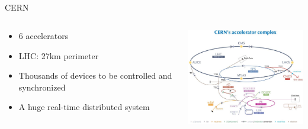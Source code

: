 \documentclass[compress,red]{beamer}
\begin{document}
\subsection{}
\begin{frame}{CERN}

\begin{columns}[c]
    \begin{center}

      \begin{itemize}
	\item 6 accelerators
	\item LHC: 27km perimeter
	\item Thousands of devices to be controlled and synchronized
	\item A huge real-time distributed system
      \end{itemize}

    \end{center}
    \begin{center}
      \includegraphics[width=6.5cm]{applications/CERN/accelerators.pdf}
    \end{center}
\end{columns}

\end{frame}
\end{document}
